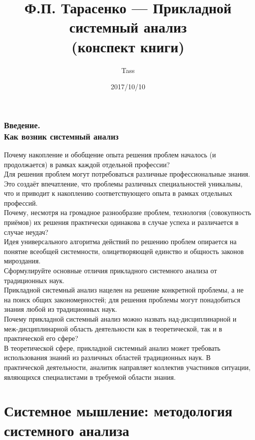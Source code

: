 \documentclass{article}
\begin{document}
\title{Ф.П. Тарасенко --- Прикладной системный анализ\\(конспект книги)}
\author{Tass}
\date{2017/10/10}
\maketitle

\tableofcontents
\newpage

\section*{\flushright Введение.\\Как возник системный анализ}

Почему накопление и обобщение опыта решения проблем началось (и продолжается) в рамках каждой отдельной профессии?
\\
Для решения проблем могут потребоваться различные профессиональные знания. Это создаёт впечатление, что проблемы различных специальностей уникальны, что и приводит к накоплению соответствующего опыта в рамках отдельных профессий.
\\
Почему, несмотря на громадное разнообразие проблем, технология (совокупность приёмов) их решения практически одинакова в случае успеха и различается в случае неудач?
\\
Идея универсального алгоритма действий по решению проблем опирается на понятие всеобщей системности, олицетворяющей единство и общность законов мироздания.
\\
Сформулируйте основные отличия прикладного системного анализа от традиционных наук.
\\
Прикладной системный анализ нацелен на решение конкретной проблемы, а не на поиск общих закономерностей; для решения проблемы могут понадобиться знания любой из традиционных наук.
\\
Почему прикладной системный анализ можно назвать над-дисциплинарной и меж-дисциплинарной область деятельности как в теоретической, так и в практической его сфере?
\\
В теоретической сфере, прикладной системный анализ может требовать использования знаний из различных областей традиционных наук. В практической деятельности, аналитик направляет коллектив участников ситуации, являющихся специалистами в требуемой области знания.
\newpage
\part{Системное мышление: методология системного анализа}
\end{document}
